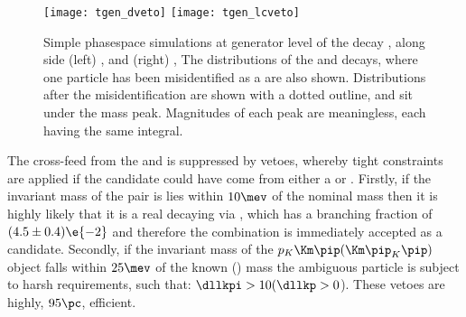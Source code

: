 \begin{figure}
  \begin{center}
    \texttt{[image: tgen\_dveto]}
    \texttt{[image: tgen\_lcveto]}
    \caption[Vetoing \Ds contamination from \Lc and \Dp decays]
    {
      Simple phasespace simulations at generator level of the decay \decay{\Ds}{\kkpi}, along side
      (left) \decay{\Dp}{\kpipiss}, and
      (right) \decay{\Lc}{\pkpi},
      The distributions of the \Dp and \Lc decays, where one particle has been misidentified as a
      \Kp are also shown.
      Distributions after the misidentification are shown with a dotted outline, and sit under the
      \Ds mass peak.
      Magnitudes of each peak are meaningless, each having the same integral.
    }
    \label{fig:dsphi:veto}
  \end{center}
\end{figure}

The cross-feed from the \Dp and \Lc is suppressed by vetoes, whereby tight \pid constraints are
applied if the \dstokkpi candidate could have come from either a \Dp or \Lc.
Firstly, if the invariant mass of the \kk pair is lies within $10\mev$ of the nominal \phii mass
then it is highly likely that it is a real \Ds decaying via \decay{\Ds}{\phi\pip}, which has a
branching fraction of $(4.5\pm0.4)\e{-2}$ and therefore the \kkpi combination is immediately
accepted as a \Ds candidate.
Secondly, if the invariant mass of the $p_K\Km\pip(\Km\pip_K\pip)$ object falls within $25\mev$ of
the known \Dp(\Lc) mass the ambiguous particle is subject to harsh \pid requirements, such that:
$\dllkpi>10(\dllkp>0$).
These vetoes are highly, \approx$95\pc$, efficient.






